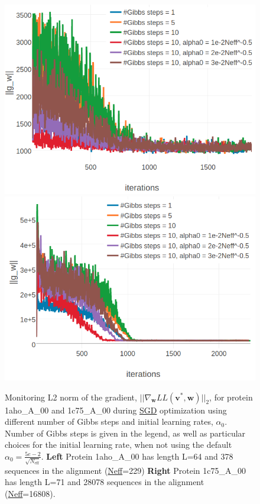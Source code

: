 \documentclass[11pt,a4paper,twoside]{book}
\renewcommand{\v}{\mathbf{v}}
\newcommand{\w}{\mathbf{w}}
\theoremstyle{definition}
\theoremstyle{definition}
\theoremstyle{remark}
\begin{document}
\begin{figure}

{\centering \includegraphics[width=0.48\linewidth]{img/full_likelihood/gibbs_sampling/gradient_norm_1ahoa00} \includegraphics[width=0.48\linewidth]{img/full_likelihood/gibbs_sampling/gradient_norm_1c75a00} 

}

\caption{Monitoring L2 norm
of the gradient, \(||\nabla_{\w} L\!L(\v^*, \w)||_2\), for protein
1aho\_A\_00 and 1c75\_A\_00 during \protect\hyperlink{abbrev}{SGD}
optimization using different number of Gibbs steps and initial learning
rates, \(\alpha_0\). Number of Gibbs steps is given in the legend, as
well as particular choices for the initial learning rate, when not using
the default \(\alpha_0 = \frac{5e-2}{\sqrt{N_{\text{eff}}}}\).
\textbf{Left} Protein 1aho\_A\_00 has length L=64 and 378 sequences in
the alignment (\protect\hyperlink{abbrev}{Neff}=229) \textbf{Right}
Protein 1c75\_A\_00 has length L=71 and 28078 sequences in the alignment
(\protect\hyperlink{abbrev}{Neff}=16808).}\label{fig:cd-gibbssteps-single-proteins-gradient}
\end{figure}
\end{document}
